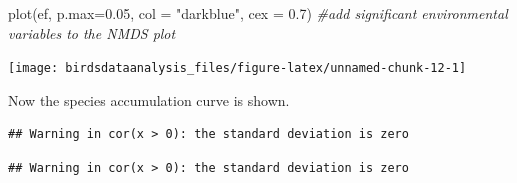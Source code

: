 \documentclass[
]{article}
\newenvironment{Shaded}{\begin{snugshade}}{\end{snugshade}}
\newcommand{\AttributeTok}[1]{\textcolor[rgb]{0.77,0.63,0.00}{#1}}
\newcommand{\CommentTok}[1]{\textcolor[rgb]{0.56,0.35,0.01}{\textit{#1}}}
\newcommand{\DecValTok}[1]{\textcolor[rgb]{0.00,0.00,0.81}{#1}}
\newcommand{\FloatTok}[1]{\textcolor[rgb]{0.00,0.00,0.81}{#1}}
\newcommand{\FunctionTok}[1]{\textcolor[rgb]{0.00,0.00,0.00}{#1}}
\newcommand{\NormalTok}[1]{#1}
\newcommand{\OtherTok}[1]{\textcolor[rgb]{0.56,0.35,0.01}{#1}}
\newcommand{\SpecialCharTok}[1]{\textcolor[rgb]{0.00,0.00,0.00}{#1}}
\newcommand{\StringTok}[1]{\textcolor[rgb]{0.31,0.60,0.02}{#1}}
\begin{document}
\begin{Shaded}
\begin{Highlighting}[]
\FunctionTok{plot}\NormalTok{(ef, }\AttributeTok{p.max=}\FloatTok{0.05}\NormalTok{, }\AttributeTok{col =} \StringTok{"darkblue"}\NormalTok{, }\AttributeTok{cex =} \FloatTok{0.7}\NormalTok{) }\CommentTok{\#add significant environmental variables to the NMDS plot}
\end{Highlighting}
\end{Shaded}

\texttt{[image: birdsdataanalysis\_files/figure-latex/unnamed-chunk-12-1]}

Now the species accumulation curve is shown.

\begin{Shaded}
\end{Shaded}

\begin{verbatim}
## Warning in cor(x > 0): the standard deviation is zero
\end{verbatim}

\begin{Shaded}
\end{Shaded}

\begin{verbatim}
## Warning in cor(x > 0): the standard deviation is zero
\end{verbatim}
\end{document}
